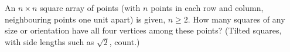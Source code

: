 An $n\times n$ square array of points (with $n$ points in each row and column, neighbouring points one unit apart) is given, $n\ge2$. How many squares of any size or orientation have all four vertices among these points? (Tilted squares, with side lengths such as $\sqrt2$, count.)
